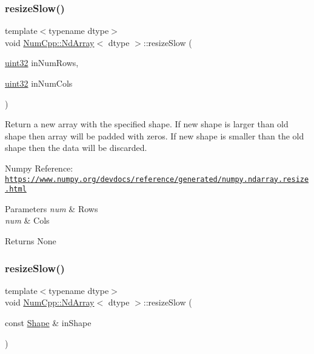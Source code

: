 \subsubsection{\texorpdfstring{resize\+Slow()}{resizeSlow()}\hspace{0.1cm}{\footnotesize\ttfamily [1/2]}}
{\footnotesize\ttfamily template$<$typename dtype$>$ \\
void \mbox{\hyperlink{class_num_cpp_1_1_nd_array}{Num\+Cpp\+::\+Nd\+Array}}$<$ dtype $>$\+::resize\+Slow (\begin{DoxyParamCaption}\item[{\mbox{\hyperlink{namespace_num_cpp_a36f388e948380413c63011cab9b7fbd5}{uint32}}}]{in\+Num\+Rows,  }\item[{\mbox{\hyperlink{namespace_num_cpp_a36f388e948380413c63011cab9b7fbd5}{uint32}}}]{in\+Num\+Cols }\end{DoxyParamCaption})\hspace{0.3cm}{\ttfamily [inline]}}

Return a new array with the specified shape. If new shape is larger than old shape then array will be padded with zeros. If new shape is smaller than the old shape then the data will be discarded.

Numpy Reference\+: \href{https://www.numpy.org/devdocs/reference/generated/numpy.ndarray.resize.html}{\tt https\+://www.\+numpy.\+org/devdocs/reference/generated/numpy.\+ndarray.\+resize.\+html}


\begin{DoxyParams}{Parameters}
{\em num} & Rows \\
\hline
{\em num} & Cols \\
\hline
\end{DoxyParams}
\begin{DoxyReturn}{Returns}
None 
\end{DoxyReturn}
\mbox{\label{class_num_cpp_1_1_nd_array_a2c15c12587bdf8cdfd497b9848cb60f9}} 
\subsubsection{\texorpdfstring{resize\+Slow()}{resizeSlow()}\hspace{0.1cm}{\footnotesize\ttfamily [2/2]}}
{\footnotesize\ttfamily template$<$typename dtype$>$ \\
void \mbox{\hyperlink{class_num_cpp_1_1_nd_array}{Num\+Cpp\+::\+Nd\+Array}}$<$ dtype $>$\+::resize\+Slow (\begin{DoxyParamCaption}\item[{const \mbox{\hyperlink{class_num_cpp_1_1_shape}{Shape}} \&}]{in\+Shape }\end{DoxyParamCaption})\hspace{0.3cm}{\ttfamily [inline]}}

